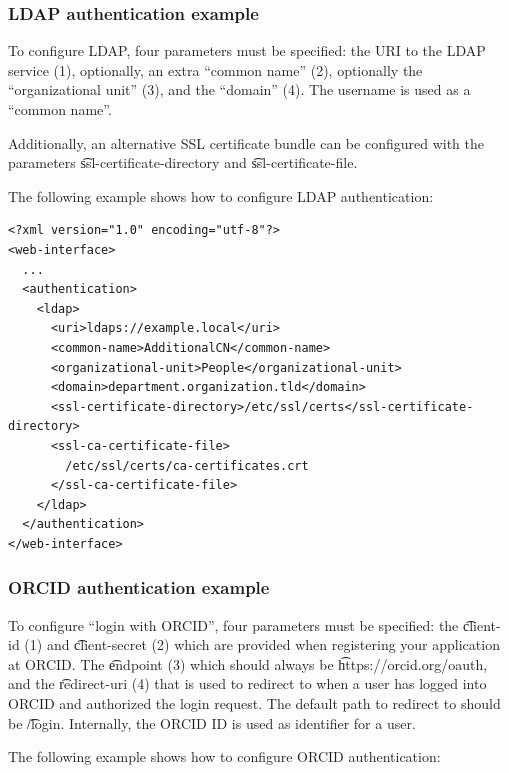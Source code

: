 \subsubsection{LDAP authentication example}

  To configure LDAP, four parameters must be specified: the URI to the LDAP
  service (1), optionally, an extra ``common name'' (2), optionally the
  ``organizational unit'' (3), and the ``domain'' (4).  The username is used
  as a ``common name''.

  \begin{sloppypar}
  Additionally, an alternative SSL certificate bundle can be configured with
  the parameters \t{ssl-certificate-directory} and
  \t{ssl-certificate-file}.
  \end{sloppypar}

  The following example shows how to configure LDAP authentication:

\begin{siderules}
\begin{verbatim}
<?xml version="1.0" encoding="utf-8"?>
<web-interface>
  ...
  <authentication>
    <ldap>
      <uri>ldaps://example.local</uri>
      <common-name>AdditionalCN</common-name>
      <organizational-unit>People</organizational-unit>
      <domain>department.organization.tld</domain>
      <ssl-certificate-directory>/etc/ssl/certs</ssl-certificate-directory>
      <ssl-ca-certificate-file>
        /etc/ssl/certs/ca-certificates.crt
      </ssl-ca-certificate-file>
    </ldap>
  </authentication>
</web-interface>
\end{verbatim}
\end{siderules}

\subsubsection{ORCID authentication example}

  To configure ``login with ORCID'', four parameters must be specified:
  the \t{client-id} (1) and \t{client-secret} (2) which are provided
  when registering your application at ORCID.  The \t{endpoint} (3) which
  should always be \t{https://orcid.org/oauth}, and the \t{redirect-uri}
  (4) that is used to redirect to when a user has logged into ORCID and
  authorized the login request.  The default path to redirect to should
  be \t{/login}.  Internally, the ORCID ID is used as identifier for a user.

  The following example shows how to configure ORCID authentication:


